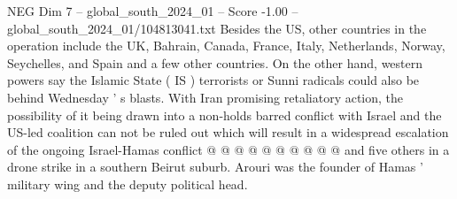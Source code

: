 \begin{textsample}{NEG Dim 7 – global\_south\_2024\_01 – Score -1.00 – global\_south\_2024\_01/104813041.txt}
Besides the US, other countries in the operation include the UK, Bahrain, Canada, France, Italy, Netherlands, Norway, Seychelles, and Spain and a few other countries.
On the other hand, western powers say the Islamic State ( IS ) terrorists or Sunni radicals could also be behind Wednesday ' s blasts.
With Iran promising retaliatory action, the possibility of it being drawn into a non-holds barred conflict with Israel and the US-led coalition can not be ruled out which will result in a widespread escalation of the ongoing Israel-Hamas conflict @ @ @ @ @ @ @ @ @ @ and five others in a drone strike in a southern Beirut suburb.
Arouri was the founder of Hamas ' military wing and the deputy political head.

\end{textsample}
